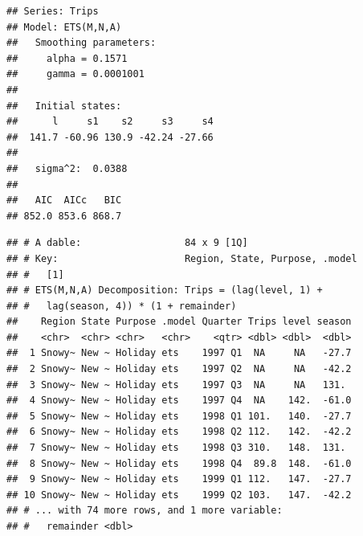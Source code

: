 \documentclass[]{book}
\newenvironment{Shaded}{\begin{snugshade}}{\end{snugshade}}
\newcommand{\KeywordTok}[1]{\textcolor[rgb]{0.13,0.29,0.53}{\textbf{#1}}}
\newcommand{\NormalTok}[1]{#1}
\newcommand{\OperatorTok}[1]{\textcolor[rgb]{0.81,0.36,0.00}{\textbf{#1}}}
\newcommand{\StringTok}[1]{\textcolor[rgb]{0.31,0.60,0.02}{#1}}
\begin{document}
\begin{Shaded}
\end{Shaded}

\begin{verbatim}
## Series: Trips 
## Model: ETS(M,N,A) 
##   Smoothing parameters:
##     alpha = 0.1571 
##     gamma = 0.0001001 
## 
##   Initial states:
##      l     s1    s2     s3     s4
##  141.7 -60.96 130.9 -42.24 -27.66
## 
##   sigma^2:  0.0388
## 
##   AIC  AICc   BIC 
## 852.0 853.6 868.7
\end{verbatim}

\begin{Shaded}
\end{Shaded}

\begin{verbatim}
## # A dable:                  84 x 9 [1Q]
## # Key:                      Region, State, Purpose, .model
## #   [1]
## # ETS(M,N,A) Decomposition: Trips = (lag(level, 1) +
## #   lag(season, 4)) * (1 + remainder)
##    Region State Purpose .model Quarter Trips level season
##    <chr>  <chr> <chr>   <chr>    <qtr> <dbl> <dbl>  <dbl>
##  1 Snowy~ New ~ Holiday ets    1997 Q1  NA     NA   -27.7
##  2 Snowy~ New ~ Holiday ets    1997 Q2  NA     NA   -42.2
##  3 Snowy~ New ~ Holiday ets    1997 Q3  NA     NA   131. 
##  4 Snowy~ New ~ Holiday ets    1997 Q4  NA    142.  -61.0
##  5 Snowy~ New ~ Holiday ets    1998 Q1 101.   140.  -27.7
##  6 Snowy~ New ~ Holiday ets    1998 Q2 112.   142.  -42.2
##  7 Snowy~ New ~ Holiday ets    1998 Q3 310.   148.  131. 
##  8 Snowy~ New ~ Holiday ets    1998 Q4  89.8  148.  -61.0
##  9 Snowy~ New ~ Holiday ets    1999 Q1 112.   147.  -27.7
## 10 Snowy~ New ~ Holiday ets    1999 Q2 103.   147.  -42.2
## # ... with 74 more rows, and 1 more variable:
## #   remainder <dbl>
\end{verbatim}

\begin{Shaded}
\end{Shaded}
\end{document}
